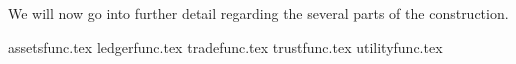   We will now go into further detail regarding the several parts of the construction.

  {assetsfunc.tex}
  {ledgerfunc.tex}
  {tradefunc.tex}
  {trustfunc.tex}
  {utilityfunc.tex}

